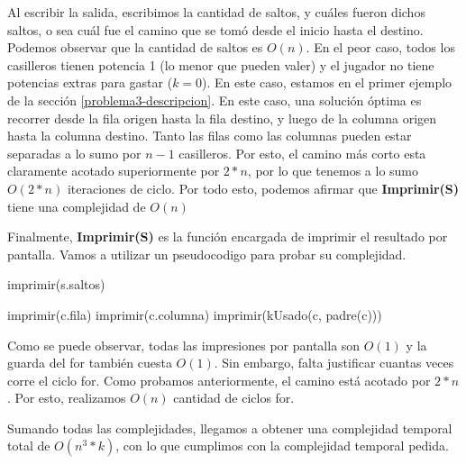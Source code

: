 Al escribir la salida, escribimos la cantidad de saltos, y cuáles fueron dichos saltos, o sea cuál fue el camino que se tomó desde el inicio hasta el destino. Podemos observar que la cantidad de saltos es $O(n)$. En el peor caso, todos los casilleros tienen potencia 1 (lo menor que pueden valer) y el jugador no tiene potencias extras para gastar ($k=0$). En este caso, estamos en el primer ejemplo de la sección  \ref{problema3-descripcion}. En este caso, una solución óptima es recorrer desde la fila origen hasta la fila destino, y luego de la columna origen hasta la columna destino. Tanto las filas como las columnas pueden estar separadas a lo sumo por $n-1$ casilleros. Por esto, el camino más corto esta claramente acotado superiormente por $2*n$, por lo que tenemos a lo sumo $O(2*n)$ iteraciones de ciclo. Por todo esto, podemos afirmar que \textbf{Imprimir(S)} tiene una complejidad de $O(n)$

Finalmente, \textbf{Imprimir(S)} es la función encargada de imprimir el resultado por pantalla. Vamos a utilizar un pseudocodigo para probar su complejidad.

\begin{pseudo}
        \State imprimir(s.saltos) 

		 
        \State imprimir(c.fila) 
        \State imprimir(c.columna) 
        \State imprimir(kUsado(c, padre(c))) 
        
      	\EndFor
        
    \EndProcedure
\end{pseudo}

Como se puede observar, todas las impresiones por pantalla son $O(1)$ y la guarda del for también cuesta $O(1)$. Sin embargo, falta justificar cuantas veces corre el ciclo for. Como probamos anteriormente, el camino está acotado por $2*n$. Por esto, realizamos $O(n)$ cantidad de ciclos for.

Sumando todas las complejidades, llegamos a obtener una complejidad temporal total de $O(n^3 * k)$, con lo que cumplimos con la complejidad temporal pedida.